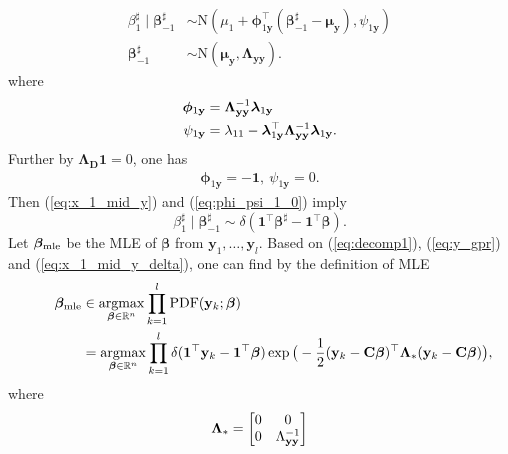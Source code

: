 \documentclass[a4paper, 11pt]{article}
\newcommand{\R}{\mathbb{R}}
\newcommand{\1}{\mathbf{1}}
\DeclareMathOperator*{\argmax}{argmax}
\DeclareMathOperator*{\argmin}{argmin}
\newcommand{\xb}{\mathbf{x}}
\newcommand{\yb}{\mathbf{y}}
\newcommand{\Cb}{\mathbf{C}}
\newcommand{\Db}{\mathbf{D}}
\newcommand{\normdist}{\mathrm{N}}
\newcommand{\phib}{\bm{\phi}}
\newcommand{\lambdab}{{\bm \lambda}}
\newcommand{\betab}{\bm{\beta}}
\newcommand{\mub}{\bm{\mu}}
\newcommand{\Lambdab}{\bm{\Lambda}}
\newcommand{\betamlefs}{{\betab}_{\textnormal{mle}}}
\begin{document}
{	\begin{align}\label{eq:x_1_mid_y}
	\beta^\sharp_1\mid\betab^\sharp_{-1}&\sim\normdist(\mu_1+\phib_{1\yb}^\top(\betab^\sharp_{-1}-\mub_{\yb}),\psi_{1\yb})\\
	\betab^\sharp_{-1}&\sim\normdist(\mub_{\yb},\Lambdab_{\yb\yb}).\label{eq:y_gpr}
	\end{align}
	where
	\begin{equation}\notag
	\begin{aligned}
	\phib_{1\yb}&=\Lambdab_{\yb\yb}^{-1}\lambdab_{1\yb}\\
	\psi_{1\yb}&=\lambda_{11}-\lambdab_{1\yb}^\top\Lambdab_{\yb\yb}^{-1}\lambdab_{1\yb}.
	\end{aligned}
	\end{equation}
	{Further by $\Lambdab_{\Db}\1=0$, one has
		\begin{equation}\label{eq:phi_psi_1_0}
		\begin{aligned}
		\phib_{1\yb}=-\1,\
		\psi_{1\yb}=0.
		\end{aligned}
		\end{equation}
		Then (\ref{eq:x_1_mid_y}) and (\ref{eq:phi_psi_1_0}) imply
		\begin{equation}\label{eq:x_1_mid_y_delta}
		\beta^\sharp_1\mid\betab^\sharp_{-1} \sim \delta(\1^\top \betab^\sharp-\1^\top\betab).
		\end{equation}
		Let $\betamlefs$ be the MLE of $\betab$ from $\yb_1,\dots,\yb_l$. Based on (\ref{eq:decomp1}), (\ref{eq:y_gpr}) and (\ref{eq:x_1_mid_y_delta}), one can find by the definition of MLE
		\begin{align}
		\qquad\betamlefs\notag
		&\in\argmax\limits_{\betab\in\R^n} \prod\limits_{k=1}^l {\rm PDF}(\yb_k;\betab)\notag\\
		&= \argmax\limits_{\betab\in\R^n} \prod\limits_{k=1}^l\delta(\1^\top \yb_k-\1^\top\betab)\exp\big(-\frac{1}{2}(\yb_k-\Cb\betab)^\top\Lambdab_\ast (\yb_k-\Cb\betab)\big),\label{eq:mlepfs_objectivefunction}
		\end{align}
		where
		\begin{equation}\notag
		\begin{aligned}
		\Lambdab_\ast =
		\begin{bmatrix}
		0 & 0\\
		0 & \Lambda_{\yb\yb}^{-1}

\end{bmatrix}
\end{aligned}
\end{equation}}}
\end{document}
